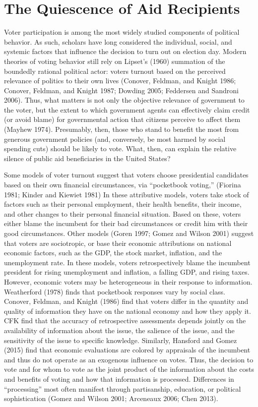 \documentclass[12pt]{paper}
\begin{document}
\section{The Quiescence of Aid Recipients}
Voter participation is among the most widely studied components of political behavior. As such, scholars have long considered the individual, social, and systemic factors that influence the decision to turn out on election day. Modern theories of voting behavior still rely on Lipset’s (1960) summation of the boundedly rational political actor: voters turnout based on the perceived relevance of politics to their own lives (Conover, Feldman, and Knight 1986; Conover, Feldman, and Knight 1987; Dowding 2005; Feddersen and Sandroni 2006). Thus, what matters is not only the objective relevance of government to the voter, but the extent to which government agents can effectively claim credit (or avoid blame) for governmental action that citizens perceive to affect them (Mayhew 1974). Presumably, then, those who stand to benefit the most from generous government policies (and, conversely, be most harmed by social spending cuts) should be likely to vote. What, then, can explain the relative silence of public aid beneficiaries in the United States?

Some models of voter turnout suggest that voters choose presidential candidates based on their own financial circumstances, via ``pocketbook voting,” (Fiorina 1981; Kinder and Kiewiet 1981) In these attributive models, voters take stock of factors such as their personal employment, their health benefits, their income, and other changes to their personal financial situation. Based on these, voters either blame the incumbent for their bad circumstances or credit him with their good circumstances. Other models (Goren 1997; Gomez and Wilson 2001) suggest that voters are sociotropic, or base their economic attributions on national economic factors, such as the GDP, the stock market, inflation, and the unemployment rate. In these models, voters retrospectively blame the incumbent president for rising unemployment and inflation, a falling GDP, and rising taxes.  However, economic voters may be heterogeneous in their response to information. Weatherford (1978) finds that pocketbook responses vary by social class. Conover, Feldman, and Knight  (1986) find that voters differ in the quantity and quality of information they have on the national economy and how they apply it. CFK find that the accuracy of retrospective assessments depends jointly on the availability of information about the issue, the salience of the issue, and the sensitivity of the issue to specific knowledge. Similarly, Hansford and Gomez (2015) find that economic evaluations are colored by appraisals of the incumbent and thus do not operate as an exogenous influence on votes. Thus, the decision to vote and for whom to vote as the joint product of the information about the costs and benefits of voting and how that information is processed. Differences in “processing” most often manifest through partisanship, education, or political sophistication (Gomez and Wilson 2001; Arceneaux 2006; Chen 2013). 
\end{document}
